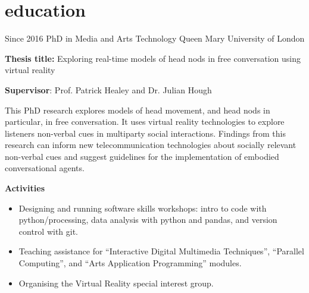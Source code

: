 \documentclass[]{friggeri-cv}
\begin{document}

\section{education}

\begin{entrylist}

    \entry
    {Since 2016}
    {PhD in Media and Arts Technology}
    {Queen Mary University of London}
    {
      \textbf{Thesis title:} Exploring real-time models of head nods in free conversation using virtual reality

      \textbf{Supervisor}: Prof. Patrick Healey and Dr. Julian Hough

      This PhD research explores models of head movement, and head nods in particular, in free conversation.
      It uses virtual reality technologies to explore listeners non-verbal cues in multiparty social interactions.
      Findings from this research can inform new telecommunication technologies about socially relevant non-verbal cues and suggest guidelines for the implementation of embodied conversational agents.

      \textbf{Activities}
      \begin{itemize}
        \item
          Designing and running software skills workshops: intro to code with python/processing, data analysis with python and pandas, and version control with git.
        \item
          Teaching assistance for ``Interactive Digital Multimedia Techniques'', ``Parallel Computing'', and ``Arts Application Programming'' modules.
        \item
          Organising the Virtual Reality special interest group.
      \end{itemize}
    }

\end{entrylist}
\end{document}
